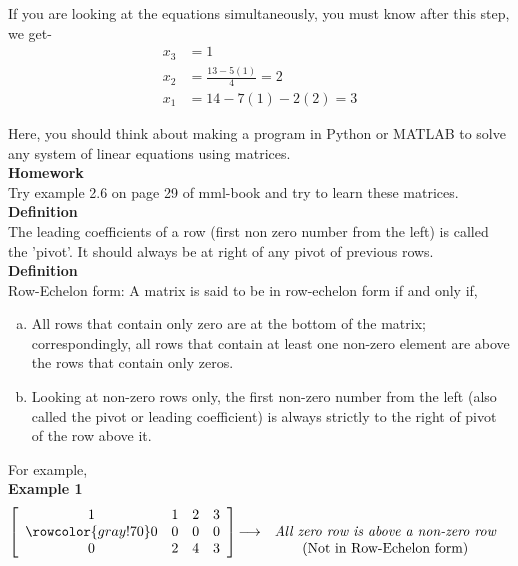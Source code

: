 \documentclass{article}
\begin{document}
If you are looking at the equations simultaneously, you must know after this step, we get-  \\

\begin{equation} \tag{Back Substitution}
\begin{split}
x_3 &= 1\\
x_2 &= \frac{13 - 5(1)}{4} = 2 \\
x_1 &= 14 - 7(1) - 2(2) = 3
\end{split}
\end{equation}

Here, you should think about making a program in Python or MATLAB to solve any system of linear equations using matrices.\\
\textbf{Homework}\\
Try example 2.6 on page 29 of mml-book and try to learn these matrices.\\

\textbf{Definition}\\
The leading coefficients of a row (first non zero number from the left) is called the 'pivot'. It should always be at right of any pivot of previous rows.\\

\textbf{Definition}\\
Row-Echelon form: A matrix is said to be in row-echelon form if and only if,
\begin{enumerate} [a.]
    \item All rows that contain only zero are at the bottom of the matrix; correspondingly, all rows that contain at least one non-zero element are above the rows that contain only zeros.
    \item Looking at non-zero rows only, the first non-zero number from the left (also called the pivot or leading coefficient) is always strictly to the right of pivot of the row above it.
\end{enumerate}
For example,\\



\textbf{Example 1} 
 \[
 \left[\begin{array}{cccc}
     1 &1 &2 &3\\ 
     \rowcolor{gray!70}
     0 &0 &0 &0\\
     0 &2 &4 &3
  \end{array}\right]
  \begin{matrix}
    & &\\
     \longrightarrow &\emph{All zero row is above a non-zero row}\\
    & \text{(Not in Row-Echelon form)} \nonumber
  \end{matrix}
\]
\end{document}
